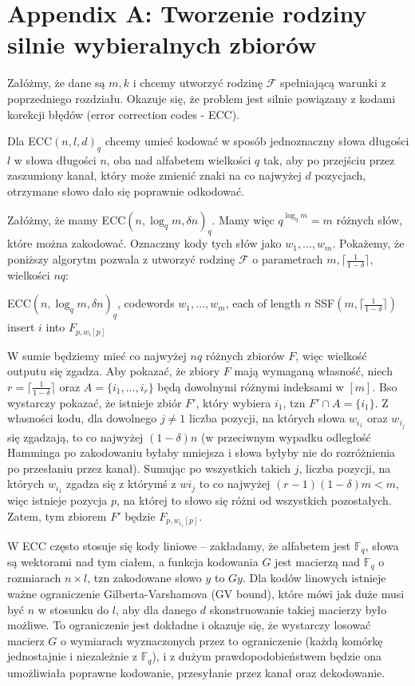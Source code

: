 \documentclass[a4paper,12pt]{article}
\theoremstyle{definition}
\begin{document}
\section*{Appendix A: Tworzenie rodziny silnie wybieralnych zbiorów}
Załóżmy, że dane są $m,k$ i chcemy utworzyć rodzinę $\mathcal F$ spełniającą warunki z poprzedniego rozdziału.
Okazuje się, że problem jest silnie powiązany z kodami korekcji błędów (error correction codes - ECC). 

Dla ECC$(n, l, d)_q$ chcemy umieć kodować w sposób jednoznaczny słowa długości $l$ w słowa długości $n$, oba nad alfabetem wielkości $q$ tak, aby po przejściu przez zaszumiony kanał, który może zmienić znaki na co najwyżej $d$ pozycjach, otrzymane słowo dało się poprawnie odkodować.

Załóżmy, że mamy ECC$(n, \log_q m, \delta n)_q$. Mamy więc $q^{\log_q m} = m$ różnych słów, które można zakodować. Oznaczmy kody tych słów jako $w_1, \dots, w_m$. Pokażemy, że poniższy algorytm pozwala z utworzyć rodzinę $\mathcal F$ o parametrach $m, \lceil\frac{1}{1-\delta} \rceil$, wielkości $nq$:

\begin{algorithm}[H]
\begin{algorithmic} 
\REQUIRE ECC$(n, \log_q m, \delta n)_q$, codewords $w_1, \dots, w_m$, each of length $n$
\ENSURE SSF$(m, \lceil\frac{1}{1-\delta} \rceil)$
\STATE insert $i$ into $F_{p, w_i[p]}$
\ENDFOR
\ENDFOR
\end{algorithmic}
\end{algorithm}
W sumie będziemy mieć co najwyżej $nq$ różnych zbiorów $F$, więc wielkość outputu się zgadza. 
Aby pokazać, że zbiory $F$ mają wymaganą własność, niech $r = \lceil \frac{1}{1-\delta} \rceil$ oraz $A = \{i_1, \dots, i_r\}$ będą dowolnymi różnymi indeksami w $[m]$. Bso wystarczy pokazać, że istnieje zbiór $F'$, który wybiera $i_1$, tzn $F' \cap A = \{i_1\}$. Z własności kodu, dla dowolnego $j \ne 1$ liczba pozycji, na których słowa $w_{i_1}$ oraz $w_{i_j}$ się zgadzają, to co najwyżej $(1-\delta)n$ (w przeciwnym wypadku odległość Hamminga po zakodowaniu byłaby mniejsza i słowa byłyby nie do rozróżnienia po przesłaniu przez kanał). Sumując po wszystkich takich $j$, liczba pozycji, na których $w_{i_1}$ zgadza się z którymś z $w{i_j}$ to co najwyżej $(r-1)(1-\delta)m < m$, więc istnieje pozycja $p$, na której to słowo się różni od wszystkich pozostałych. Zatem, tym zbiorem $F'$ będzie $F_{p, w_{i_1}[p]}$.

W ECC często stosuje się kody liniowe -- zakładamy, że alfabetem jest $\mathbb F_q$, słowa są wektorami nad tym ciałem, a funkcja kodowania $G$ jest macierzą nad $\mathbb F_q$ o rozmiarach $n \times l$, tzn zakodowane słowo $y$ to $Gy$. Dla kodów linowych istnieje ważne ograniczenie Gilberta-Varshamova (GV bound), które mówi jak duże musi być $n$ w stosunku do $l$, aby dla danego $d$ skonstruowanie takiej macierzy było możliwe. To ograniczenie jest dokładne i okazuje się, że
wystarczy losować macierz $G$ o wymiarach wyznaczonych przez to ograniczenie (każdą komórkę jednostajnie i niezależnie z $\mathbb F_q$), i z dużym prawdopodobieństwem będzie ona umożliwiała poprawne kodowanie, przesyłanie przez kanał oraz dekodowanie.
\end{document}
